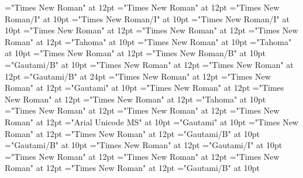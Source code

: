 \documentclass[a4paper,twoside]{article}
\begin{document}
\font\spanenspanensensesensesentryletDatadicBody="Times New Roman" at 12pt
\font\spanensensesensesentryletDatadicBody="Times New Roman" at 12pt
\font\spanenspanengrammaticalinfosensesensesentryletDatadicBody="Times New Roman/I" at 10pt
\font\spanengrammaticalinfosensesensesentryletDatadicBody="Times New Roman/I" at 10pt
\font\grammaticalinfosensesensesentryletDatadicBody="Times New Roman/I" at 10pt
\font\sensesensesentryletDatadicBody="Times New Roman" at 12pt
\font\sensesentryletDatadicBody="Times New Roman" at 12pt
\font\spanenpronunciationsentryletDatadicBody="Times New Roman" at 12pt
\font\spanggofonipaxemicpronunciationpronunciationsentryletDatadicBody="Tahoma" at 10pt
\font\spanenpronunciationpronunciationsentryletDatadicBody="Times New Roman" at 10pt
\font\pronunciationpronunciationsentryletDatadicBody="Tahoma" at 10pt
\font\pronunciationsentryletDatadicBody="Times New Roman" at 12pt
\font\spanenheadwordentryletDatadicBody="Times New Roman/B" at 10pt
\font\headwordentryletDatadicBody="Gautami/B" at 10pt
\font\entryletDatadicBody="Times New Roman" at 12pt
\font{}="Times New Roman" at 12pt
\font{}="Gautami/B" at 24pt
\font{}="Times New Roman" at 12pt
\font\xitemtpi="Times New Roman" at 12pt
\font\xitemxitemtranslationLdbefore="Gautami" at 10pt
\font\xitemxitemtranslationbefore="Times New Roman" at 12pt
\font\sensesensesensesbefore="Times New Roman" at 12pt
\font\xitemxitempronunciationsbefore="Times New Roman" at 12pt
\font\xitemxitempronunciationbefore="Tahoma" at 10pt
\font\xitemxitemprimaryrefsbefore="Times New Roman" at 12pt
\font\xitemxitempictureLabelbefore="Times New Roman" at 12pt
\font\xitemxitempartofspeechbefore="Times New Roman" at 12pt
\font\xitemxitemLexSensepublishStemGlossPubLebefore="Arial Unicode MS" at 10pt
\font\xitemxitemLexSensepublishStemGlossPubLdbefore="Gautami" at 10pt
\font\xitemxitemLexEntryTypepublishStemEntryTypeAbbreviationPubbefore="Times New Roman" at 12pt
\font\xitemxitemLexEntryTypepublishStemComplexFormTypeReverseAbbrPubbefore="Times New Roman" at 12pt
\font\xitemxitemLexEntrypublishStemComponentTargetHeadWordRefbefore="Gautami/B" at 10pt
\font\xitemxitemheadwordbefore="Gautami/B" at 10pt
\font\xitemxitemexamplesbefore="Times New Roman" at 12pt
\font\xitemxitemexamplebefore="Gautami/I" at 10pt
\font\xitemxitementryreftypebefore="Times New Roman" at 12pt
\font\xitemxitementryrefcomponentbefore="Times New Roman" at 12pt
\font\xitemxitemdefinitionbefore="Times New Roman" at 12pt
\font\xitemxitemcomplexformrefsbefore="Times New Roman" at 12pt
\font\xitemxitemcomplexformformbefore="Gautami/B" at 10pt
\end{document}
